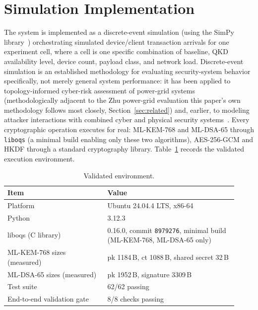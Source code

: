 \documentclass[journal]{IEEEtran}
\begin{document}
\section{Simulation Implementation}
\label{sec:implementation}

The system is implemented as a discrete-event simulation (using the SimPy library~\cite{simpy2024paper}) orchestrating simulated device/client transaction arrivals for one experiment cell, where a cell is one specific combination of baseline, QKD availability level, device count, payload class, and network load. Discrete-event simulation is an established methodology for evaluating security-system behavior specifically, not merely general system performance: it has been applied to topology-informed cyber-risk assessment of power-grid systems~\cite{despowergridrisk2024} (methodologically adjacent to the Zhu power-grid evaluation this paper's own methodology follows most closely, Section~\ref{sec:related}) and, earlier, to modeling attacker interactions with combined cyber and physical security systems~\cite{desattackerinteraction2015}. Every cryptographic operation executes for real: ML-KEM-768 and ML-DSA-65 through \texttt{liboqs} (a minimal build enabling only these two algorithms), AES-256-GCM and HKDF through a standard cryptography library. Table~\ref{tab:environment} records the validated execution environment.

\begin{table}[t]
\centering
\caption{Validated environment.}
\label{tab:environment}
\small
\begin{tabular}{@{}p{0.40\linewidth}p{0.52\linewidth}@{}}
\toprule
Item & Value \\
\midrule
Platform & Ubuntu 24.04.4 LTS, x86-64 \\
Python & 3.12.3 \\
liboqs (C library) & 0.16.0, commit \texttt{8979276}, minimal build (ML-KEM-768, ML-DSA-65 only) \\
ML-KEM-768 sizes (measured) & pk 1184\,B, ct 1088\,B, shared secret 32\,B \\
ML-DSA-65 sizes (measured) & pk 1952\,B, signature 3309\,B \\
Test suite & 62/62 passing \\
End-to-end validation gate & 8/8 checks passing \\
\bottomrule
\end{tabular}
\end{table}
\end{document}
